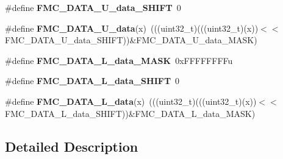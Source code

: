 \begin{DoxyCompactItemize}
\item 
\#define {\bfseries F\+M\+C\+\_\+\+D\+A\+T\+A\+\_\+\+U\+\_\+data\+\_\+\+S\+H\+I\+FT}~0\hypertarget{group__FMC__Register__Masks_gaa7a3b8bfa7aac03f2eef0b5e58dfbb44}{}\label{group__FMC__Register__Masks_gaa7a3b8bfa7aac03f2eef0b5e58dfbb44}

\item 
\#define {\bfseries F\+M\+C\+\_\+\+D\+A\+T\+A\+\_\+\+U\+\_\+data}(x)~(((uint32\+\_\+t)(((uint32\+\_\+t)(x))$<$$<$F\+M\+C\+\_\+\+D\+A\+T\+A\+\_\+\+U\+\_\+data\+\_\+\+S\+H\+I\+FT))\&F\+M\+C\+\_\+\+D\+A\+T\+A\+\_\+\+U\+\_\+data\+\_\+\+M\+A\+SK)\hypertarget{group__FMC__Register__Masks_ga1d2a8d98c4d178ac289f37108e881404}{}\label{group__FMC__Register__Masks_ga1d2a8d98c4d178ac289f37108e881404}

\item 
\#define {\bfseries F\+M\+C\+\_\+\+D\+A\+T\+A\+\_\+\+L\+\_\+data\+\_\+\+M\+A\+SK}~0x\+F\+F\+F\+F\+F\+F\+F\+Fu\hypertarget{group__FMC__Register__Masks_gaefcb45152ed3dc9c4ac7b353f4eab44b}{}\label{group__FMC__Register__Masks_gaefcb45152ed3dc9c4ac7b353f4eab44b}

\item 
\#define {\bfseries F\+M\+C\+\_\+\+D\+A\+T\+A\+\_\+\+L\+\_\+data\+\_\+\+S\+H\+I\+FT}~0\hypertarget{group__FMC__Register__Masks_gabef8366f6d036877a0600a2594f08bfb}{}\label{group__FMC__Register__Masks_gabef8366f6d036877a0600a2594f08bfb}

\item 
\#define {\bfseries F\+M\+C\+\_\+\+D\+A\+T\+A\+\_\+\+L\+\_\+data}(x)~(((uint32\+\_\+t)(((uint32\+\_\+t)(x))$<$$<$F\+M\+C\+\_\+\+D\+A\+T\+A\+\_\+\+L\+\_\+data\+\_\+\+S\+H\+I\+FT))\&F\+M\+C\+\_\+\+D\+A\+T\+A\+\_\+\+L\+\_\+data\+\_\+\+M\+A\+SK)\hypertarget{group__FMC__Register__Masks_ga10e9daea84fd57e92170db3aedf7610a}{}\label{group__FMC__Register__Masks_ga10e9daea84fd57e92170db3aedf7610a}

\end{DoxyCompactItemize}


\subsection{Detailed Description}
